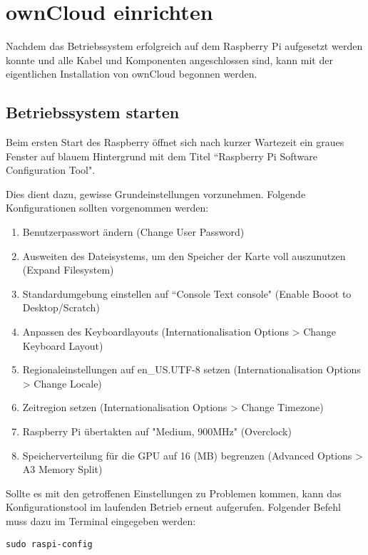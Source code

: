 \section{ownCloud einrichten}
Nachdem das Betriebssystem erfolgreich auf dem Raspberry Pi aufgesetzt werden konnte und alle Kabel und Komponenten angeschlossen sind, kann mit der eigentlichen Installation von ownCloud begonnen werden.

\subsection{Betriebssystem starten}
Beim ersten Start des Raspberry öffnet sich nach kurzer Wartezeit ein graues Fenster auf blauem Hintergrund mit dem Titel ``Raspberry Pi Software Configuration Tool". 


Dies dient dazu, gewisse Grundeinstellungen vorzunehmen. Folgende Konfigurationen sollten vorgenommen werden: 

\begin{enumerate}
\item Benutzerpasswort ändern (Change User Password)
\item Ausweiten des Dateisystems, um den Speicher der Karte voll auszunutzen (Expand Filesystem)
\item Standardumgebung einstellen auf ``Console Text console" (Enable Booot to Desktop/Scratch)
\item Anpassen des Keyboardlayouts (Internationalisation Options > Change Keyboard Layout)
\item Regionaleinstellungen auf en\_US.UTF-8 setzen (Internationalisation Options > Change Locale)
\item Zeitregion setzen (Internationalisation Options > Change Timezone) 
\item Raspberry Pi übertakten auf "Medium, 900MHz" (Overclock)
\item Speicherverteilung für die GPU auf 16 (MB) begrenzen (Advanced Options > A3 Memory Split)
\end{enumerate}

Sollte es mit den getroffenen Einstellungen zu Problemen kommen, kann das Konfigurationstool im laufenden Betrieb erneut aufgerufen. Folgender Befehl muss dazu im Terminal eingegeben werden: 

\begin{lstlisting}
sudo raspi-config
\end{lstlisting} 


